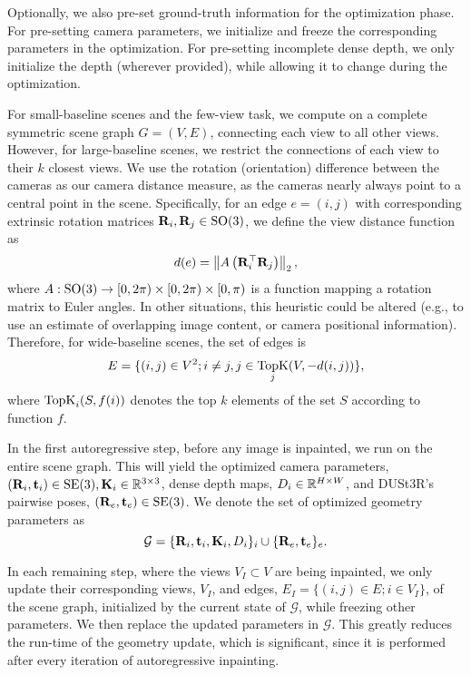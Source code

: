 Optionally, we also pre-set ground-truth information for the optimization phase. For pre-setting camera parameters, we initialize and freeze the corresponding parameters in the optimization. For pre-setting incomplete dense depth, we only initialize the depth (wherever provided), while allowing it to change during the optimization.

For small-baseline scenes and the few-view task, we compute \duster on a complete symmetric scene graph $G = (V, E)$, connecting each view to all other views. However, for large-baseline scenes, we restrict the connections of each view to their $k$ closest views. We use the rotation (orientation) difference between the cameras as our camera distance measure, as the cameras nearly always point to a central point in the scene.
Specifically, for an edge $e = (i, j)$ with corresponding extrinsic rotation matrices $\mathbf{R}_i, \mathbf{R}_j \in \operatorname{SO}(3)$, we define the view distance function as
\begin{equation}
d(e) = \left\| A\left(\mathbf{R}_i^\top \mathbf{R}_j\right) \right\|_2,
\label{eq:view-distance}
\end{equation}
where $A: \operatorname{SO}(3) \to [0, 2\pi) \times [0, 2\pi) \times [0, \pi)$ is a function mapping a rotation matrix to Euler angles. In other situations, this heuristic could be altered (e.g., to use an estimate of overlapping image content, or camera positional information). Therefore, for wide-baseline scenes, the set of edges is
\begin{equation}
E = \{(i, j) \in V^2 ; i \neq j, j \in \operatorname*{TopK}_j (V, -d(i, j)) \},
\end{equation}
where $\operatorname*{TopK}_i (S, f(i))$ denotes the top $k$ elements of the set $S$ according to function $f$.

In the first autoregressive step, before any image is inpainted, we run \duster on the entire scene graph. This will yield the optimized camera parameters, $(\mathbf{R}_i, \mathbf{t}_i) \in \operatorname{SE}(3), \mathbf{K}_i \in \mathbb{R}^{3\times 3}$, dense depth maps, $D_i \in \mathbb{R}^{H \times W}$, and DUSt3R's pairwise poses, $(\mathbf{R}_e, \mathbf{t}_e) \in \operatorname{SE}(3)$. We denote the set of optimized geometry parameters as 
\begin{equation}
\mathcal{G} = \{\mathbf{R}_i, \mathbf{t}_i, \mathbf{K}_i, D_i\}_i \cup \{\mathbf{R}_e, \mathbf{t}_e\}_e.
\end{equation}

In each remaining step, where the views $V_I \subset V$ are being inpainted, we only update their corresponding views, $V_I$, and edges, $E_I = \{(i, j) \in E ; i \in V_I \}$, of the scene graph, initialized by the current state of $\mathcal{G}$, while freezing other parameters. We then replace the updated parameters in $\mathcal{G}$. This greatly reduces the run-time of the geometry update, which is significant, since it is performed after every iteration of autoregressive inpainting.

